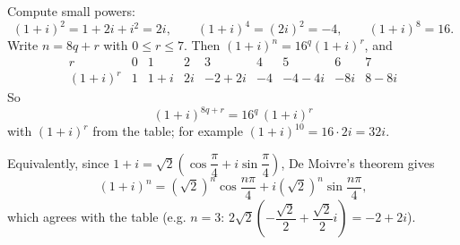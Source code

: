 Compute small powers:
\[(1+i)^2=1+2i+i^2=2i,\qquad(1+i)^4=(2i)^2=-4,\qquad(1+i)^8=16.\]
Write $n=8q+r$ with $0\le r\le7$. Then $(1+i)^n=16^q(1+i)^r$, and
\[\begin{array}{c|cccccccc}
r&0&1&2&3&4&5&6&7\\\hline
(1+i)^r&1&1+i&2i&-2+2i&-4&-4-4i&-8i&8-8i
\end{array}\]
So
\[\boxed{(1+i)^{8q+r}=16^q\,(1+i)^r}\]
with $(1+i)^r$ from the table; for example $(1+i)^{10}=16\cdot2i=32i$.

Equivalently, since $1+i=\sqrt2\left(\cos\dfrac\pi4+i\sin\dfrac\pi4\right)$, De Moivre's theorem gives
\[(1+i)^n=\left(\sqrt2\right)^n\cos\dfrac{n\pi}{4}+i\left(\sqrt2\right)^n\sin\dfrac{n\pi}{4},\]
which agrees with the table (e.g. $n=3$: $2\sqrt2\left(-\dfrac{\sqrt2}2+\dfrac{\sqrt2}2i\right)=-2+2i$).
